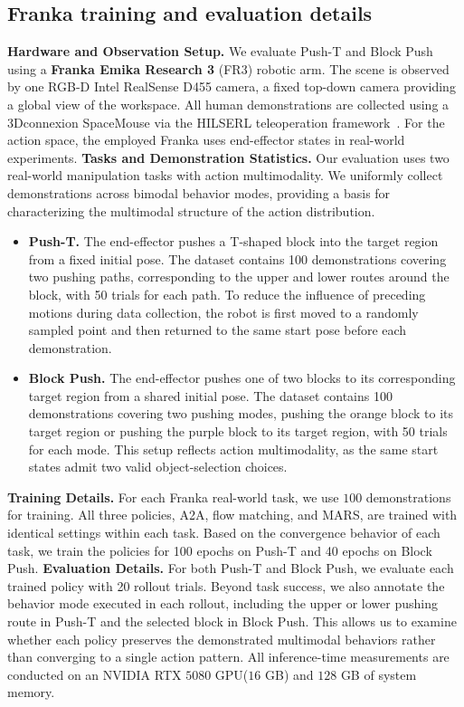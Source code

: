 \subsection{Franka training and evaluation details}

\textbf{Hardware and Observation Setup.}
We evaluate Push-T and Block Push using a \textbf{Franka Emika Research 3} (FR3) robotic arm. The scene is observed by one RGB-D Intel RealSense D455 camera, a fixed top-down camera providing a global view of the workspace. All human demonstrations are collected using a 3Dconnexion SpaceMouse via the HILSERL teleoperation framework~\citep{luo2025precise}. For the action space, the employed Franka uses end-effector states in real-world experiments.
\textbf{Tasks and Demonstration Statistics.}
Our evaluation uses two real-world manipulation tasks with action multimodality. We uniformly collect demonstrations across bimodal behavior modes, providing a basis for characterizing the multimodal structure of the action distribution.
\begin{itemize}[leftmargin=1em, labelsep=0.4em, itemsep=0.25em, topsep=0.25em]
\item \textbf{Push-T.} The end-effector pushes a T-shaped block into the target region from a fixed initial pose. The dataset contains {100 demonstrations} covering two pushing paths, corresponding to the upper and lower routes around the block, with 50 trials for each path. To reduce the influence of preceding motions during data collection, the robot is first moved to a randomly sampled point and then returned to the same start pose before each demonstration.

\item \textbf{Block Push.} The end-effector pushes one of two blocks to its corresponding target region from a shared initial pose.
The dataset contains {100 demonstrations} covering two pushing modes, pushing the orange block to its target region or pushing the purple block to its target region, with 50 trials for each mode.
This setup reflects action multimodality, as the same start states admit two valid object-selection choices.
\end{itemize}

\textbf{Training Details.}
For each Franka real-world task, we use $100$ demonstrations for training. All three policies, A2A, flow matching, and MARS, are trained with identical settings within each task.
Based on the convergence behavior of each task, we train the policies for 100 epochs on Push-T and 40 epochs on Block Push.
\textbf{Evaluation Details.}
For both Push-T and Block Push, we evaluate each trained policy with 20 rollout trials. 
Beyond task success, we also annotate the behavior mode executed in each rollout, including the upper or lower pushing route in Push-T and the selected block in Block Push.
This allows us to examine whether each policy preserves the demonstrated multimodal behaviors rather than converging to a single action pattern.
All inference-time measurements are  conducted on an NVIDIA RTX $5080$ GPU($16$ GB) and $128$ GB of system memory.

